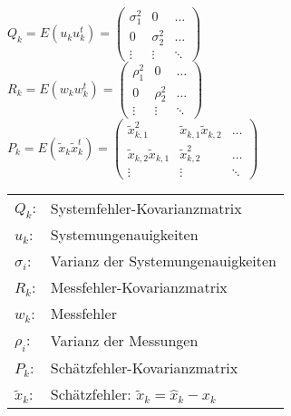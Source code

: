 	\begin{minipage}{8cm}
		$Q_k = E(u_k u_k^t) = \begin{pmatrix} \sigma_1^2 & 0 & \hdots \\
								0 & \sigma_2^2 & \hdots \\
								\vdots & \vdots & \ddots \end{pmatrix}$ \\
		
		$R_k = E(w_k w_k^t) = \begin{pmatrix} \rho_1^2 & 0 & \hdots \\
								0 & \rho_2^2 & \hdots \\
								\vdots & \vdots & \ddots \end{pmatrix}$ \\
		
		$P_k = E(\tilde{x}_k \tilde{x}_k^t) = \begin{pmatrix} 
							\tilde{x}_{k,1}^2 & \tilde{x}_{k,1}\tilde{x}_{k,2} & \hdots \\
							\tilde{x}_{k,2}\tilde{x}_{k,1} & \tilde{x}_{k,2}^2 & \hdots \\
							\vdots & \vdots & \ddots 	\end{pmatrix}$ 
	\end{minipage}
	\begin{minipage}{8cm}
		\begin{tabular}{ll}
				$Q_k$: & Systemfehler-Kovarianzmatrix \\
				$u_k$: & Systemungenauigkeiten \\
				$\sigma_i$: & Varianz der Systemungenauigkeiten \\
				$R_k$: & Messfehler-Kovarianzmatrix \\
				$w_k$: & Messfehler \\
				$\rho_i$: & Varianz der Messungen \\
				$P_k$: & Schätzfehler-Kovarianzmatrix \\
				$\tilde{x}_k$: & Schätzfehler: $\tilde{x}_k=\hat{x}_k-x_k$ \\
		\end{tabular}
	\end{minipage}

\newpage
	
